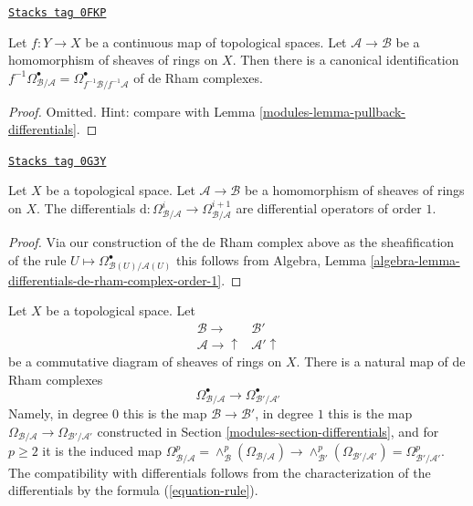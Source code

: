 \begin{lemma}
\label{modules-lemma-pullback-de-rham-complex}
\href{https://stacks.math.columbia.edu/tag/0FKP}{\texttt{Stacks tag 0FKP}}

Let $f : Y \to X$ be a continuous map of topological spaces.
Let $\mathcal{A} \to \mathcal{B}$
be a homomorphism of sheaves of rings on $X$.
Then there is a canonical identification
$f^{-1}\Omega^\bullet_{\mathcal{B}/\mathcal{A}} =
\Omega^\bullet_{f^{-1}\mathcal{B}/f^{-1}\mathcal{A}}$
of de Rham complexes.
\end{lemma}

\begin{proof}

Omitted. Hint: compare with Lemma \ref{modules-lemma-pullback-differentials}.
\end{proof}

\begin{lemma}
\label{modules-lemma-differentials-de-rham-complex-order-1}
\href{https://stacks.math.columbia.edu/tag/0G3Y}{\texttt{Stacks tag 0G3Y}}

Let $X$ be a topological space. Let $\mathcal{A} \to \mathcal{B}$
be a homomorphism of sheaves of rings on $X$. The differentials
$\text{d} : \Omega^i_{\mathcal{B}/\mathcal{A}}  \to
\Omega^{i + 1}_{\mathcal{B}/\mathcal{A}}$
are differential operators of order $1$.
\end{lemma}

\begin{proof}
Via our construction of the de Rham complex above as the sheafification
of the rule  $U \mapsto \Omega^\bullet_{\mathcal{B}(U)/\mathcal{A}(U)}$
this follows from
Algebra, Lemma \ref{algebra-lemma-differentials-de-rham-complex-order-1}.
\end{proof}

Let $X$ be a topological space. Let
$$
\begin{array}{cc}\mathcal{B} \longrightarrow & \mathcal{B}' \\ \mathcal{A} \longrightarrow\uparrow & \mathcal{A}' \uparrow\end{array}
$$
be a commutative diagram of sheaves of rings on $X$.
There is a natural map of de Rham complexes
$$
\Omega^\bullet_{\mathcal{B}/\mathcal{A}} \longrightarrow
\Omega^\bullet_{\mathcal{B}'/\mathcal{A}'}
$$
Namely, in degree $0$ this is the map $\mathcal{B} \to \mathcal{B}'$,
in degree $1$ this is the map
$\Omega_{\mathcal{B}/\mathcal{A}} \to \Omega_{\mathcal{B}'/\mathcal{A}'}$
constructed in Section \ref{modules-section-differentials}, and for $p \geq 2$
it is the induced map
$\Omega^p_{\mathcal{B}/\mathcal{A}} =
\wedge^p_\mathcal{B}(\Omega_{\mathcal{B}/\mathcal{A}}) \to
\wedge^p_{\mathcal{B}'}(\Omega_{\mathcal{B}'/\mathcal{A}'}) =
\Omega^p_{\mathcal{B}'/\mathcal{A}'}$.
The compatibility with differentials follows from the characterization
of the differentials by the formula (\ref{equation-rule}).

